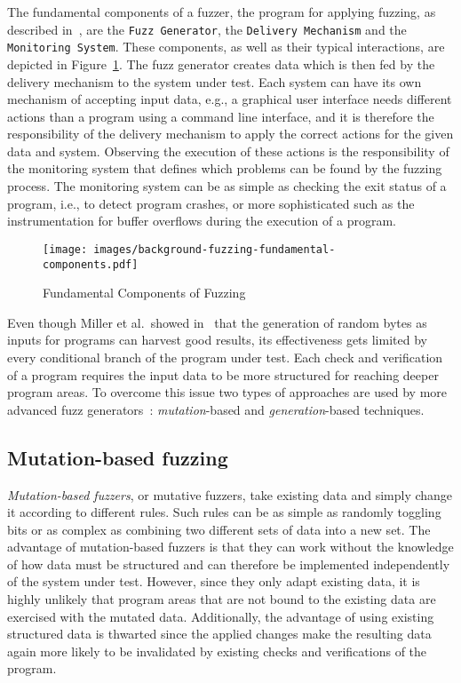 The fundamental components of a fuzzer, the program for applying fuzzing, as described in~\cite{mcnally2012fuzzing}, are the \texttt{Fuzz Generator}, the \texttt{Delivery Mechanism} and the \texttt{Monitoring System}. These components, as well as their typical interactions, are depicted in Figure~\ref{fig:backgroundFuzzingFundamentalComponents}. The fuzz generator creates data which is then fed by the delivery mechanism to the system under test. Each system can have its own mechanism of accepting input data, e.g., a graphical user interface needs different actions than a program using a command line interface, and it is therefore the responsibility of the delivery mechanism to apply the correct actions for the given data and system. Observing the execution of these actions is the responsibility of the monitoring system that defines which problems can be found by the fuzzing process. The monitoring system can be as simple as checking the exit status of a program, i.e., to detect program crashes, or more sophisticated such as the instrumentation for buffer overflows during the execution of a program.

\begin{figure}[t]
\texttt{[image: images/background-fuzzing-fundamental-components.pdf]}
\caption{Fundamental Components of Fuzzing}
\label{fig:backgroundFuzzingFundamentalComponents}
\end{figure}

Even though Miller et al.~showed in~\cite{miller1995fuzz} that the generation of random bytes as inputs for programs can harvest good results, its effectiveness gets limited by every conditional branch of the program under test. Each check and verification of a program requires the input data to be more structured for reaching deeper program areas. To overcome this issue two types of approaches are used by more advanced fuzz generators~\cite{takanen2008fuzzing}: \emph{mutation}-based and \emph{generation}-based techniques.

\subsection{Mutation-based fuzzing}
\label{subsec:mutatinFuzzing}

\emph{Mutation-based fuzzers}, or mutative fuzzers, take existing data and simply change it according to different rules. Such rules can be as simple as randomly toggling bits or as complex as combining two different sets of data into a new set. The advantage of mutation-based fuzzers is that they can work without the knowledge of how data must be structured and can therefore be implemented independently of the system under test. However, since they only adapt existing data, it is highly unlikely that program areas that are not bound to the existing data are exercised with the mutated data. Additionally, the advantage of using existing structured data is thwarted since the applied changes make the resulting data again more likely to be invalidated by existing checks and verifications of the program.

